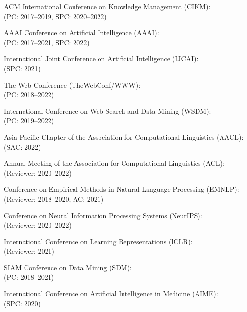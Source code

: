 \documentclass[10pt]{article}
\newenvironment{myindentpar}[1]%
{\begin{list}{}%
         {\setlength{\leftmargin}{#1}}%
         \item[]%
}
{\end{list}}
\newcounter{list}
\begin{document}
\begin{myindentpar}{0.75cm}
{\hspace{-0.75cm}ACM International Conference on Knowledge Management (CIKM): \\
(PC: 2017--2019, SPC: 2020--2022)

\hspace{-0.75cm}AAAI Conference on Artificial Intelligence (AAAI): \\
(PC: 2017--2021, SPC: 2022)

\hspace{-0.75cm}International Joint Conference on Artificial Intelligence (IJCAI): \\
(SPC: 2021)

\hspace{-0.75cm}The Web Conference (TheWebConf/WWW): \\
(PC: 2018--2022)

\hspace{-0.75cm}International Conference on Web Search and Data Mining (WSDM): \\
(PC: 2019--2022)

\hspace{-0.75cm}Asia-Pacific Chapter of the Association for Computational Linguistics (AACL): \\
(SAC: 2022)

\hspace{-0.75cm}Annual Meeting of the Association for Computational Linguistics (ACL): \\
(Reviewer: 2020--2022)

\hspace{-0.75cm}Conference on Empirical Methods in Natural Language Processing (EMNLP): \\
(Reviewer: 2018--2020; AC: 2021)

\hspace{-0.75cm}Conference on Neural Information Processing Systems (NeurIPS): \\
(Reviewer: 2020--2022)

\hspace{-0.75cm}International Conference on Learning Representations (ICLR): \\
(Reviewer: 2021)

\hspace{-0.75cm}SIAM Conference on Data Mining (SDM): \\
(PC: 2018--2021)

\hspace{-0.75cm}International Conference on Artificial Intelligence in Medicine (AIME): \\
(SPC: 2020)

}
\end{myindentpar}
\end{document}
